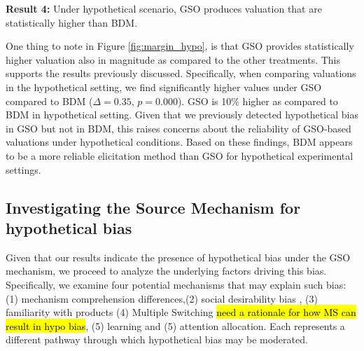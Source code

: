 \documentclass[12pt]{article}
\begin{document}
\vspace{0.5cm}

\textbf{Result 4:} Under hypothetical scenario, GSO produces valuation that are statistically higher than BDM.

One thing to note in Figure \ref{fig:margin_hypo}, is that GSO provides statistically higher valuation also in magnitude as compared to the other treatments. This supports the results previously discussed. Specifically, when comparing valuations in the hypothetical setting, we find significantly higher values under GSO compared to BDM  (\(\Delta = 0.35\), \(p = 0.000\)). GSO  is 10\% higher as compared to BDM in hypothetical setting. Given that we previously detected hypothetical bias in GSO but not in BDM, this raises concerns about the reliability of GSO-based valuations under hypothetical conditions. Based on these findings, BDM appears to be a more reliable elicitation method than GSO for hypothetical experimental settings.

\vspace{0.5cm}







            
\subsection{Investigating the Source Mechanism for hypothetical bias}

 Given that our results indicate the presence of hypothetical bias under the GSO mechanism, we proceed to analyze the underlying factors driving this bias. Specifically, we examine four potential mechanisms that may explain such bias: (1) mechanism comprehension differences,(2) social desirability bias \citep{lopez2021social, norwood2011social,bursztyn2025social}, (3) familiarity with products \citep{fox1998cvm, veettil_hypothetical_2024}   (4) Multiple Switching \hl{need a rationale for how MS can result in hypo bias}, (5) learning and (5) attention allocation. Each represents a different pathway through which hypothetical bias may be moderated.
 
\end{document}
